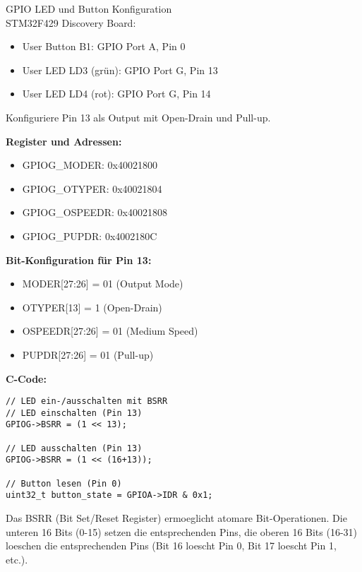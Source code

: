 \begin{example2}{GPIO LED und Button Konfiguration}\\
    STM32F429 Discovery Board:
    \begin{itemize}
        \item User Button B1: GPIO Port A, Pin 0
        \item User LED LD3 (grün): GPIO Port G, Pin 13
        \item User LED LD4 (rot): GPIO Port G, Pin 14
    \end{itemize}
    
    Konfiguriere Pin 13 als Output mit Open-Drain und Pull-up.
    
    \tcblower
    
    \textbf{Register und Adressen:}
    \begin{itemize}
        \item GPIOG\_MODER: 0x40021800
        \item GPIOG\_OTYPER: 0x40021804
        \item GPIOG\_OSPEEDR: 0x40021808
        \item GPIOG\_PUPDR: 0x4002180C
    \end{itemize}
    
    \textbf{Bit-Konfiguration für Pin 13:}
    \begin{itemize}
        \item MODER[27:26] = 01 (Output Mode)
        \item OTYPER[13] = 1 (Open-Drain)
        \item OSPEEDR[27:26] = 01 (Medium Speed)
        \item PUPDR[27:26] = 01 (Pull-up)
    \end{itemize}
    
    \textbf{C-Code:}
\begin{lstlisting}[style=basesmol]
// LED ein-/ausschalten mit BSRR
// LED einschalten (Pin 13)
GPIOG->BSRR = (1 << 13);

// LED ausschalten (Pin 13)
GPIOG->BSRR = (1 << (16+13));

// Button lesen (Pin 0)
uint32_t button_state = GPIOA->IDR & 0x1;
\end{lstlisting}
\end{example2}

\begin{remark}
    Das BSRR (Bit Set/Reset Register) ermoeglicht atomare Bit-Operationen. Die unteren 16 Bits (0-15) setzen die entsprechenden Pins, die oberen 16 Bits (16-31) loeschen die entsprechenden Pins (Bit 16 loescht Pin 0, Bit 17 loescht Pin 1, etc.).
\end{remark}

